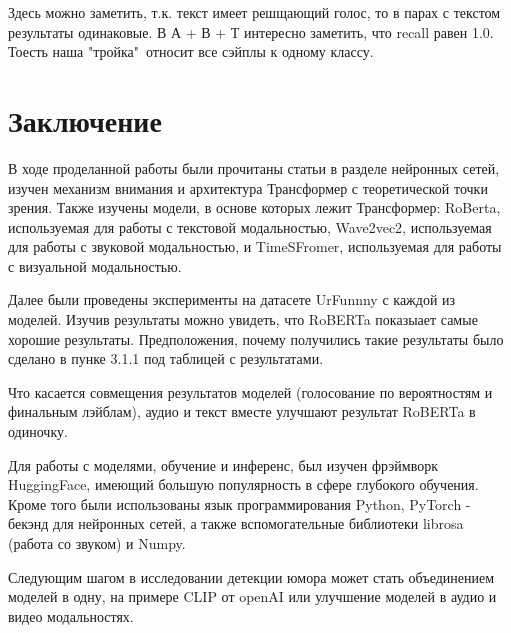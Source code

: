 \documentclass[PMI,VKR]{HSEUniversity}
\begin{document}
Здесь можно заметить, т.к. текст имеет решщающий голос, то в парах с текстом результаты одинаковые.
В А + В + Т интересно заметить, что recall равен 1.0. Тоесть наша "тройка"\ относит все сэйплы к одному классу.


\chapter{Заключение}

В ходе проделанной работы были прочитаны статьи в разделе нейронных сетей, изучен механизм внимания и архитектура Трансформер с теоретической точки зрения. Также изучены модели, в основе которых лежит Трансформер: RoBerta, используемая для работы с текстовой модальностью, Wave2vec2, используемая для работы с звуковой модальностью, и TimeSFromer, используемая для работы с визуальной модальностью.

Далее были проведены эксперименты  на датасете UrFunnny с каждой из моделей. Изучив результаты можно увидеть, что RoBERTa показыает самые хорошие результаты. Предположения, почему получились такие результаты было сделано в пунке 3.1.1 под таблицей с результатами.

Что касается совмещения результатов моделей (голосование по вероятностям и финальным лэйблам), аудио и текст вместе улучшают результат RoBERTa в одиночку.

Для работы с моделями, обучение и инференс, был изучен фрэймворк HuggingFace, имеющий большую популярность в сфере глубокого обучения. Кроме того были использованы язык программирования Python, PyTorch - бекэнд для нейронных сетей, а также вспомогательные библиотеки librosa (работа со звуком) и Numpy.

Следующим шагом в исследовании детекции юмора может стать объединением моделей в одну, на примере CLIP от openAI или улучшение моделей в аудио и видео модальностях.




\putbibliography %
\end{document}
